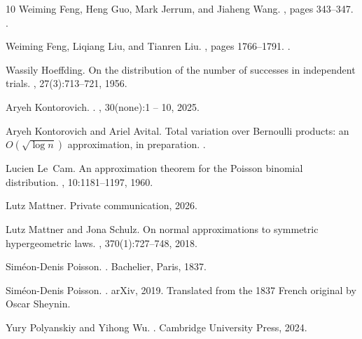 \documentclass[11pt]{amsart}
\theoremstyle{plain}
\theoremstyle{definition}
\begin{document}
\begin{thebibliography}{10}
Weiming Feng, Heng Guo, Mark Jerrum, and Jiaheng Wang.
, pages 343--347.
.

Weiming Feng, Liqiang Liu, and Tianren Liu.
,
  pages 1766--1791.
.

Wassily Hoeffding.
\newblock On the distribution of the number of successes in independent trials.
, 27(3):713--721, 1956.

Aryeh Kontorovich.
.
, 30(none):1 -- 10,
  2025.

Aryeh Kontorovich and Ariel Avital.
\newblock Total variation over {B}ernoulli products: an {$O(\sqrt{\log n})$}
  approximation, in preparation.
.

Lucien Le~Cam.
\newblock An approximation theorem for the {P}oisson binomial distribution.
, 10:1181--1197, 1960.

Lutz Mattner.
\newblock Private communication, 2026.

Lutz Mattner and Jona Schulz.
\newblock On normal approximations to symmetric hypergeometric laws.
,
  370(1):727--748, 2018.

Sim{\'e}on-Denis Poisson.
.
\newblock Bachelier, Paris, 1837.

Sim{\'e}on-Denis Poisson.
.
\newblock arXiv, 2019.
\newblock Translated from the 1837 French original by Oscar Sheynin.

Yury Polyanskiy and Yihong Wu.
.
\newblock Cambridge University Press, 2024.


\end{thebibliography}
\end{document}
